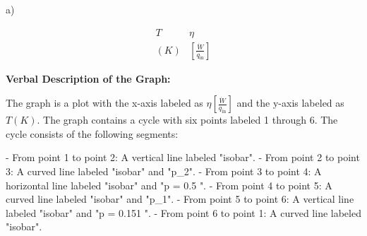 a)

\[
\begin{array}{c|c}
T & \eta \\
(K) & \left[\frac{\dot{W}}{\dot{q}_{\text{in}}}\right]
\end{array}
\]

\textbf{Verbal Description of the Graph:}

The graph is a plot with the x-axis labeled as $\eta \left[\frac{\dot{W}}{\dot{q}_{\text{in}}}\right]$ and the y-axis labeled as $T (K)$. The graph contains a cycle with six points labeled 1 through 6. The cycle consists of the following segments:

- From point 1 to point 2: A vertical line labeled "isobar".
- From point 2 to point 3: A curved line labeled "isobar" and "p_2".
- From point 3 to point 4: A horizontal line labeled "isobar" and "p = 0.5 ".
- From point 4 to point 5: A curved line labeled "isobar" and "p_1".
- From point 5 to point 6: A vertical line labeled "isobar" and "p = 0.151 ".
- From point 6 to point 1: A curved line labeled "isobar".